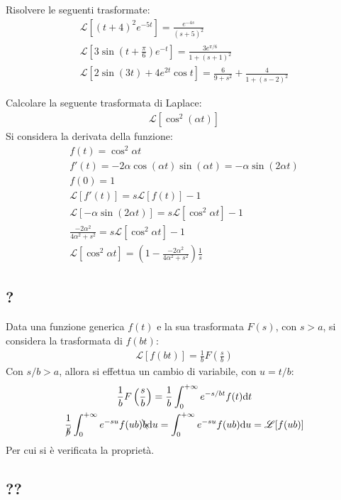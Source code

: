 \documentclass{article}
\newcommand{\df}{\mathrm{d}}
\newcommand{\intab}[4]{\displaystyle\int_{#1}^{#2}{#3}\df{#4}}
\newcommand{\intpinf}[2]{\intab{0}{+\infty}{#1}{#2}}
\numberwithin{equation}{subsection}
\begin{document}
Risolvere le seguenti trasformate:
\begin{gather*}
    \mathscr{L}[(t+4)^2e^{-5t}]=\frac{e^{-4s}}{(s+5)^2}\\
    \mathscr{L}\left[3\sin\left(t+\frac{\pi}{6}\right)e^{-t}\right]=\frac{3e^{\pi/6}}{1+(s+1)^2}\\
    \mathscr{L}\left[2\sin(3t)+4e^{2t}\cos t\right]=\frac{6}{9+s^2}+\frac{4}{1+(s-2)^2}
\end{gather*}


Calcolare la seguente trasformata di Laplace:
\begin{gather*}
    \mathscr{L}[\cos^2(\alpha t)]
\end{gather*}
Si considera la derivata della funzione:
\begin{gather*}
    f(t)=\cos^2\alpha t\\
    f'(t)=-2\alpha\cos(\alpha t)\sin(\alpha t)=-\alpha\sin(2\alpha t)\\
    f(0)=1\\
    \mathscr{L}[f'(t)]=s\mathscr{L}[f(t)]-1\\
    \mathscr{L}[-\alpha\sin(2\alpha t)]=s\mathscr{L}[\cos^2\alpha t]-1\\
    \frac{-2\alpha^2}{4\alpha^2+s^2}=s\mathscr{L}[\cos^2\alpha t]-1\\
    \mathscr{L}[\cos^2\alpha t]=\left(1-\frac{-2\alpha^2}{4\alpha^2+s^2}\right)\frac{1}{s}
\end{gather*}

\subsection{?}

Data una funzione generica $f(t)$ e la sua trasformata $F(s)$, con $s>a$, si considera la trasformata di $f(bt)$:
\begin{gather*}
    \mathscr{L}[f(bt)]=\frac{1}{b}F\left(\frac{s}{b}\right)
\end{gather*}
Con $s/b>a$, allora si effettua un cambio di variabile, con $u=t/b$:
\begin{gather*}
    \frac{1}{b}F\left(\frac{s}{b}\right)=\frac{1}{b}\intpinf{e^{-s/bt}f(t)}{t}\\
    \frac{1}{\cancel{b}}\intpinf{e^{-su}f(ub)\bcancel{b}}{u}=\intpinf{e^{-su}f(ub)}{u}=\mathscr{L}[f(ub)]
\end{gather*}
Per cui si è verificata la proprietà. 

\subsection{??}
\end{document}
